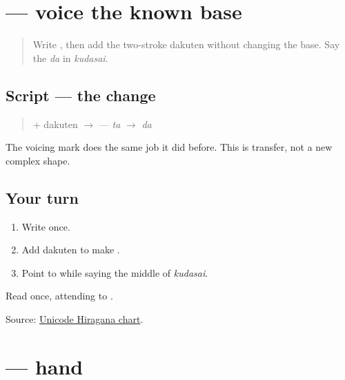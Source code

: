 \section[\texorpdfstring{\ja{だ} (da)}{だ (da)}]{ — voice the known base}

\label{lesson:JA-W11-da}



\begin{quote}
Write \textbf{}, then add the two-stroke dakuten without changing the base. Say the \emph{da} in \emph{kudasai}.
\end{quote}

\subsection*{Script — the change}

\begin{quote}
\textbf{} + dakuten $\to$ \textbf{} — \emph{ta} $\to$ \emph{da}
\end{quote}

The voicing mark does the same job it did before. This is transfer, not a new complex shape.

\subsection*{Your turn}
\begin{enumerate}
\raggedright
  \item Write \textbf{} once.
  \item Add dakuten to make \textbf{}.
  \item Point to \textbf{} while saying the middle of \emph{kudasai}.
\end{enumerate}

\begin{tcolorbox}[breakable,colback=teal!4,colframe=teal!35!black,title={Before you move on}]
Read \textbf{} once, attending to \textbf{}.

Source: \href{https://www.unicode.org/charts/PDF/U3040.pdf}{Unicode Hiragana chart}.
\end{tcolorbox}
\section[\texorpdfstring{\ja{て} (te)}{て (te)}]{ — hand}

